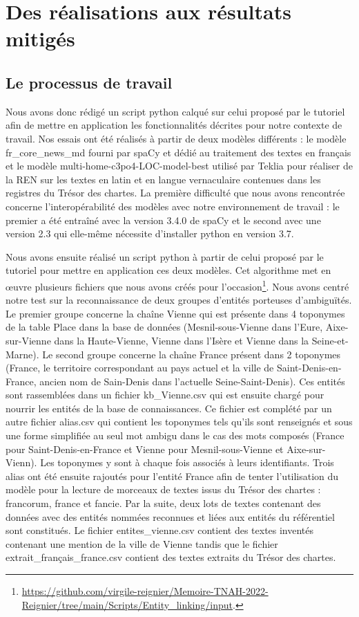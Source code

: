 \documentclass[a4paper,12pt,twoside]{book}
\begin{document}
	
	\section{Des réalisations aux résultats mitigés}
	
	\subsection{Le processus de travail}
	
	Nous avons donc rédigé un script python calqué sur celui proposé par le tutoriel afin de mettre en application les fonctionnalités décrites pour notre contexte de travail. Nos essais ont été réalisés à partir de deux modèles différents : le modèle \og fr\_core\_news\_md\fg{} fourni par spaCy et dédié au traitement des textes en français et le modèle \og multi-home-c3po4-LOC-model-best\fg{} utilisé par Teklia pour réaliser de la REN sur les textes en latin et en langue vernaculaire contenues dans les registres du Trésor des chartes. La première difficulté que nous avons rencontrée concerne l'interopérabilité des modèles avec notre environnement de travail : le premier a été entraîné avec la version 3.4.0 de spaCy et le second avec une version 2.3 qui elle-même nécessite d'installer python en version 3.7.
	
	Nous avons ensuite réalisé un script python à partir de celui proposé par le tutoriel pour mettre en application ces deux modèles. Cet algorithme met en œuvre plusieurs fichiers que nous avons créés pour l'occasion\footnote{\url{https://github.com/virgile-reignier/Memoire-TNAH-2022-Reignier/tree/main/Scripts/Entity_linking/input}.}. Nous avons centré notre test sur la reconnaissance de deux groupes d'entités porteuses d'ambiguïtés. Le premier groupe concerne la chaîne \og Vienne\fg{} qui est présente dans 4 toponymes de la table Place dans la base de données (Mesnil-sous-Vienne dans l'Eure, Aixe-sur-Vienne dans la Haute-Vienne, Vienne dans l'Isère et Vienne dans la Seine-et-Marne). Le second groupe concerne la chaîne \og France\fg{} présent dans 2 toponymes (France, le territoire correspondant au pays actuel et la ville de Saint-Denis-en-France, ancien nom de Sain-Denis dans l'actuelle Seine-Saint-Denis). Ces entités sont rassemblées dans un fichier \og kb\_Vienne.csv\fg{} qui est ensuite chargé pour nourrir les entités de la base de connaissances. Ce fichier est complété par un autre fichier \og alias.csv\fg{} qui contient les toponymes tels qu'ils sont renseignés et sous une forme simplifiée au seul mot ambigu dans le cas des mots composés (France pour Saint-Denis-en-France et Vienne pour Mesnil-sous-Vienne et Aixe-sur-Vienn). Les toponymes y sont à chaque fois associés à leurs identifiants. Trois alias ont été ensuite rajoutés pour l'entité France afin de tenter l'utilisation du modèle pour la lecture de morceaux de textes issus du Trésor des chartes : francorum, france et fancie. Par la suite, deux lots de textes contenant des données avec des entités nommées reconnues et liées aux entités du référentiel sont constitués. Le fichier \og 	entites\_vienne.csv\fg{} contient des textes inventés contenant une mention de la ville de Vienne tandis que le fichier \og extrait\_français\_france.csv\fg{} contient des textes extraits du Trésor des chartes.
	
\end{document}
